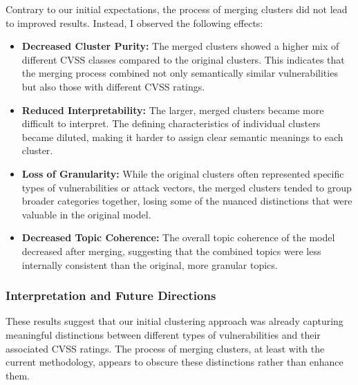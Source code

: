 

Contrary to our initial expectations, the process of merging clusters did not lead to improved
results. Instead, I observed the following effects:

\begin{itemize}
	\item \textbf{Decreased Cluster Purity:} The merged clusters showed a higher mix of different CVSS classes compared to the original clusters. This indicates that the merging process combined not only semantically similar vulnerabilities but also those with different CVSS ratings.

	\item \textbf{Reduced Interpretability:} The larger, merged clusters became more difficult to interpret. The defining characteristics of individual clusters became diluted, making it harder to assign clear semantic meanings to each cluster.

	\item \textbf{Loss of Granularity:} While the original clusters often represented specific types of vulnerabilities or attack vectors, the merged clusters tended to group broader categories together, losing some of the nuanced distinctions that were valuable in the original model.

	\item \textbf{Decreased Topic Coherence:} The overall topic coherence of the model decreased after merging, suggesting that the combined topics were less internally consistent than the original, more granular topics.
\end{itemize}

\subsubsection{Interpretation and Future Directions}

These results suggest that our initial clustering approach was already capturing meaningful
distinctions between different types of vulnerabilities and their associated CVSS ratings. The
process of merging clusters, at least with the current methodology, appears to obscure these
distinctions rather than enhance them.

